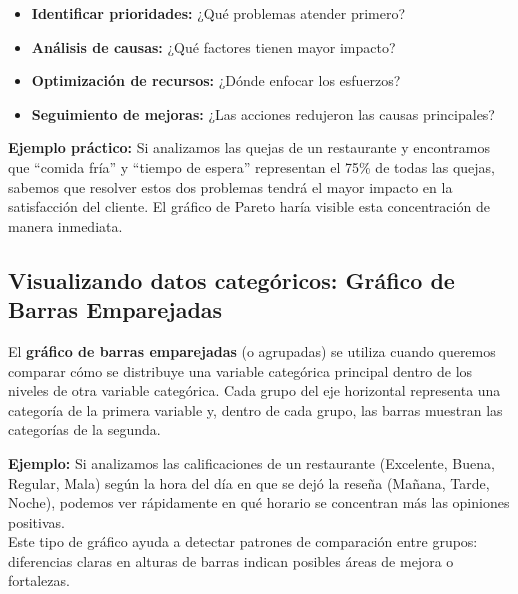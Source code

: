 \documentclass[
  spanish,
  letterpaper,
  DIV=11,
  numbers=noendperiod]{scrreprt}
\providecommand{\tightlist}{%
  \setlength{\itemsep}{0pt}\setlength{\parskip}{0pt}}
\begin{document}
\begin{tcolorbox}[enhanced jigsaw, toptitle=1mm, opacitybacktitle=0.6, leftrule=.75mm, arc=.35mm, title=\textcolor{quarto-callout-tip-color}{\faLightbulb}\hspace{0.5em}{¿Cuándo usar un gráfico de Pareto?}, colback=white, bottomrule=.15mm, colbacktitle=quarto-callout-tip-color!10!white, opacityback=0, bottomtitle=1mm, breakable, rightrule=.15mm, coltitle=black, left=2mm, titlerule=0mm, colframe=quarto-callout-tip-color-frame, toprule=.15mm]

\begin{itemize}
\tightlist
\item
  \textbf{Identificar prioridades:} ¿Qué problemas atender primero?
\item
  \textbf{Análisis de causas:} ¿Qué factores tienen mayor impacto?
\item
  \textbf{Optimización de recursos:} ¿Dónde enfocar los esfuerzos?
\item
  \textbf{Seguimiento de mejoras:} ¿Las acciones redujeron las causas
  principales?
\end{itemize}

\end{tcolorbox}

\textbf{Ejemplo práctico:} Si analizamos las quejas de un restaurante y
encontramos que ``comida fría'' y ``tiempo de espera'' representan el
75\% de todas las quejas, sabemos que resolver estos dos problemas
tendrá el mayor impacto en la satisfacción del cliente. El gráfico de
Pareto haría visible esta concentración de manera inmediata.

\subsection{Visualizando datos categóricos: Gráfico de Barras
Emparejadas}\label{visualizando-datos-categuxf3ricos-gruxe1fico-de-barras-emparejadas}

El \textbf{gráfico de barras emparejadas} (o agrupadas) se utiliza
cuando queremos comparar cómo se distribuye una variable categórica
principal dentro de los niveles de otra variable categórica. Cada grupo
del eje horizontal representa una categoría de la primera variable y,
dentro de cada grupo, las barras muestran las categorías de la segunda.

\textbf{Ejemplo:} Si analizamos las calificaciones de un restaurante
(Excelente, Buena, Regular, Mala) según la hora del día en que se dejó
la reseña (Mañana, Tarde, Noche), podemos ver rápidamente en qué horario
se concentran más las opiniones positivas.\\
Este tipo de gráfico ayuda a detectar patrones de comparación entre
grupos: diferencias claras en alturas de barras indican posibles áreas
de mejora o fortalezas.
\end{document}
